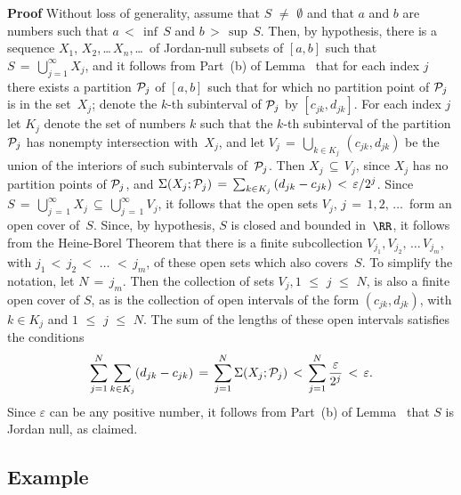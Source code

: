        {\bf Proof} Without loss of generality, assume that $S \,\,{\neq}\,\, {\emptyset}$ and that $a$ and $b$ are numbers such that $a\,<\,{\inf}\,S$ and $b\,>\,{\sup}\,S$.
    Then, by hypothesis, there is a sequence $X_{1}$, $X_{2}$,\,{\ldots}\,$X_{n}$,\,{\ldots}\, of Jordan-null subsets of $[a,b]$ such that $S \,=\, {\bigcup}_{j=1}^{{\infty}} X_{j}$,
    and it follows from Part~(b) of Lemma~ that for each index $j$ there exists a partition
    ${\cal P}_{j}$ of $[a,b]$ such that for which no partition point of ${\cal P}_{j}$ is in the set~$X_{j}$; denote the $k$-th subinterval of ${\cal P}_{j}$ by $[c_{jk},d_{jk}]$.
    For each index $j$ let $K_{j}$ denote the set of numbers $k$ such that the $k$-th subinterval of the partition ${\cal P}_{j}$ has nonempty intersection with~$X_{j}$,
    and let $V_{j} \,=\, {\bigcup}_{k{\in}K_{j}}\,(c_{jk},d_{jk})$ be the union of the interiors of such subintervals of~${\cal P}_{j}$.
    Then $X_{j} \,{\subseteq}\, V_{j}$, since $X_{j}$ has no partition points of ${\cal P}_{j}$, and ${\Sigma}(X_{j};{\cal P}_{j}) \,=\, \sum_{k{\in}K_{j}}\,(d_{jk}-c_{jk})\,<\,{\varepsilon}/2^{j}$.
    Since $S \,=\, {\bigcup}_{j \,=\, 1}^{{\infty}} X_{j} \,{\subseteq}\, {\bigcup}_{j \,=\, 1}^{{\infty}} V_{j}$, it follows that the open sets $V_{j}$, $j \,=\, 1,2,\,{\ldots}\,$ form an open cover of~$S$.
    Since, by hypothesis, $S$ is closed and bounded in~${\RR}$, it follows from the Heine-Borel Theorem that there is a finite subcollection $V_{j_{1}}, V_{j_{2}},\,{\ldots}\,V_{j_{m}}$,
    with $j_{1}\,<\,j_{2}\,<\,\,{\ldots}\,\,<\,j_{m}$, of these open sets which also covers~$S$. To simplify the notation, let $N \,=\, j_{m}$.
    Then the collection of sets $V_{j}, 1\,\,{\leq}\,\,j\,\,{\leq}\,\,N$, is also a finite open cover of $S$,
    as is the collection of open intervals of the form $(c_{jk},d_{jk})$, with $k{\in}K_{j}$ and $1\,\,{\leq}\,\,j\,\,{\leq}\,\,N$.
    The sum of the lengths of these open intervals satisfies the conditions
        \begin{displaymath}
        \sum_{j=1}^{N} \sum_{k{\in}K_{j}} (d_{jk}-c_{jk}) \,=\, \sum_{j=1}^{N} {\Sigma}(X_{j};{\cal P}_{j})
    \,<\,
    \sum_{j=1}^{N} \frac{{\varepsilon}}{2^{j}}\,<\,{\varepsilon}.
        \end{displaymath}
    Since ${\varepsilon}$ can be any positive number, it follows from Part~(b) of Lemma~ that $S$ is Jordan null, as claimed. \Q

\V
        \subsection{\small{{\bf Example}}}
        \label{ExampH20.50B}

